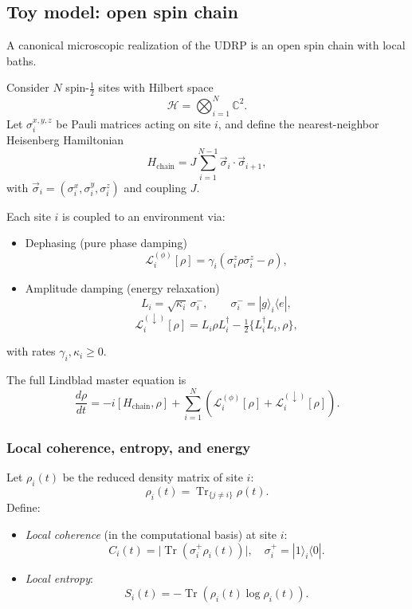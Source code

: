 \documentclass[11pt]{article}
\theoremstyle{definition}
\begin{document}
\subsection{Toy model: open spin chain}

A canonical microscopic realization of the UDRP is an open spin chain with local baths.

Consider $N$ spin-$\tfrac{1}{2}$ sites with Hilbert space
\[
\mathcal{H} = \bigotimes_{i=1}^{N} \mathbb{C}^2.
\]
Let $\sigma^{x,y,z}_i$ be Pauli matrices acting on site $i$, and define the nearest-neighbor Heisenberg Hamiltonian
\begin{equation}
H_{\text{chain}} = J \sum_{i=1}^{N-1} \vec{\sigma}_i \cdot \vec{\sigma}_{i+1},
\end{equation}
with $\vec{\sigma}_i = (\sigma_i^x,\sigma_i^y,\sigma_i^z)$ and coupling $J$.

Each site $i$ is coupled to an environment via:
\begin{itemize}
  \item Dephasing (pure phase damping)
  \[
  \mathcal{L}^{(\phi)}_i[\rho] = \gamma_i(\sigma_i^z \rho \sigma_i^z - \rho),
  \]
  \item Amplitude damping (energy relaxation)
  \[
  L_i = \sqrt{\kappa_i}\,\sigma_i^-,\qquad \sigma_i^- = |g\rangle_i\langle e|,
  \]
  \[
  \mathcal{L}^{(\downarrow)}_i[\rho] = L_i \rho L_i^\dagger - \tfrac{1}{2}\{L_i^\dagger L_i,\rho\},
  \]
\end{itemize}
with rates $\gamma_i,\kappa_i \ge 0$.

The full Lindblad master equation is
\begin{equation}
\frac{d\rho}{dt}
= -i[H_{\text{chain}},\rho]
  + \sum_{i=1}^{N} \left( \mathcal{L}^{(\phi)}_i[\rho] + \mathcal{L}^{(\downarrow)}_i[\rho] \right).
\end{equation}

\subsubsection{Local coherence, entropy, and energy}

Let $\rho_i(t)$ be the reduced density matrix of site $i$:
\[
\rho_i(t) = \operatorname{Tr}_{\{j\neq i\}} \rho(t).
\]
Define:
\begin{itemize}
  \item \emph{Local coherence} (in the computational basis) at site $i$:
  \[
  C_i(t) = \big|\operatorname{Tr}(\sigma_i^+ \rho_i(t))\big|,
  \quad
  \sigma_i^+ = |1\rangle_i\langle 0|.
  \]
  \item \emph{Local entropy}:
  \[
  S_i(t) = -\operatorname{Tr}(\rho_i(t)\log \rho_i(t)).
  \]
\end{itemize}
\end{document}
